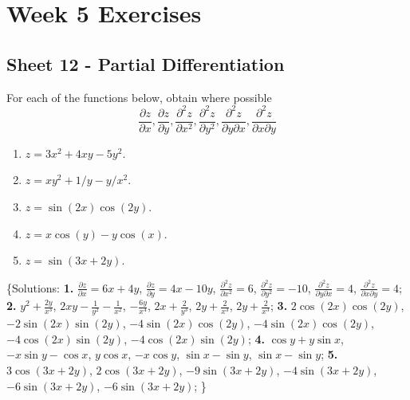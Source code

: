 \documentclass[
  english,
  11pt,
  oneside]{book}
\providecommand{\tightlist}{%
  \setlength{\itemsep}{0pt}\setlength{\parskip}{0pt}}
\newcommand{\slide}{}
\theoremstyle{definition}
\theoremstyle{definition}
\theoremstyle{definition}
\theoremstyle{definition}
\theoremstyle{remark}
\begin{document}
\chapter*{Week 5 Exercises}\label{week-5-exercises}

\section{Sheet 12 - Partial Differentiation}\label{sheet-12---partial-differentiation}

For each of the functions below, obtain where possible
\[
\frac{\partial z}{\partial x}, \frac{\partial z}{\partial y}, \frac{\partial^2 z}{\partial x^2}, \frac{\partial^2 z}{\partial y^2}, \frac{\partial^2 z}{\partial y\partial x}, \frac{\partial^2 z}{\partial x\partial y}
\]

\begin{enumerate}
\def\labelenumi{\arabic{enumi}.}
\tightlist
\item
  \(z=3x^2+4xy-5y^2\).
\item
  \(z=xy^2+1/y-y/x^2\).
\item
  \(z=\sin(2x)\cos(2y)\).
\item
  \(z=x\cos(y)-y\cos(x)\).
\item
  \(z=\sin(3x+2y)\).
\end{enumerate}

\{Solutions:
\textbf{1.} \(\frac{\partial z}{\partial x}=6x+4y\), \(\frac{\partial z}{\partial y}=4 x - 10 y\), \(\frac{\partial^2 z}{\partial x^2}=6\), \(\frac{\partial^2 z}{\partial y^2}=-10\), \(\frac{\partial^2 z}{\partial y\partial x}=4\), \(\frac{\partial^2 z}{\partial x\partial y}=4\);
\textbf{2.} \(y^2+{\frac{2y}{x^3}}\), \(2xy-{\frac{1}{y^2}}-{\frac{1}{x^2}}\), \(-{\frac{6y}{x^4}}\), \(2x+{\frac{2}{y^3}}\), \(2y+{\frac{2}{x^3}}\), \(2y+{\frac{2}{x^3}}\);
\textbf{3.} \(2\cos \left(2x\right)\cos \left(2y\right)\), \(-2\sin \left(2x\right)\sin \left(2y\right)\), \(-4\sin \left(2x\right)\cos \left(2y\right)\), \(-4\sin \left(2x\right)\cos \left(2y\right)\), \(-4\cos \left(2x\right)\sin \left(2y\right)\), \(-4\cos \left(2x\right)\sin \left(2y\right)\);
\textbf{4.} \(\cos y+y\sin x\), \(-x\sin y-\cos x\), \(y\cos x\), \(-x\cos y\), \(\sin x-\sin y\), \(\sin x-\sin y\);
\textbf{5.} \(3\cos \left(3x+2y\right)\), \(2\cos \left(3x+2y\right)\), \(-9\sin \left(3x+2y\right)\), \(-4\sin \left(3x+2y\right)\), \(-6\sin \left(3x+2y\right)\), \(-6\sin \left(3x+2y\right)\);
\}

\slide
\end{document}

